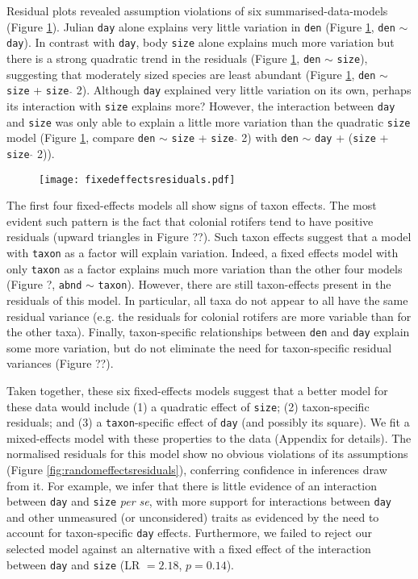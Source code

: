 \documentclass[12pt]{ecology}
\begin{document}
Residual plots revealed assumption violations of six summarised-data-models (Figure \ref{fig:fixedeffectsresiduals}).  Julian \texttt{day} alone explains very little variation in \texttt{den} (Figure \ref{fig:fixedeffectsresiduals}, \texttt{den} $\sim$ \texttt{day}).  In contrast with \texttt{day}, body \texttt{size} alone explains much more variation but there is a strong quadratic trend in the residuals (Figure \ref{fig:fixedeffectsresiduals}, \texttt{den} $\sim$ \texttt{size}), suggesting that moderately sized species are least abundant (Figure \ref{fig:fixedeffectsresiduals}, \texttt{den} $\sim$ \texttt{size} + \texttt{size} $\hat{}$ 2).  Although \texttt{day} explained very little variation on its own, perhaps its interaction with \texttt{size} explains more?  However, the interaction between \texttt{day} and \texttt{size} was only able to explain a little more variation than the quadratic \texttt{size} model (Figure \ref{fig:fixedeffectsresiduals}, compare \texttt{den} $\sim$ \texttt{size} + \texttt{size} $\hat{}$ 2) with \texttt{den} $\sim$ \texttt{day} + (\texttt{size} + \texttt{size} $\hat{}$ 2)).

\begin{figure}
\texttt{[image: fixedeffectsresiduals.pdf]}
\caption{}
\label{fig:fixedeffectsresiduals}
\end{figure}

The first four fixed-effects models all show signs of taxon effects.  The most evident such pattern is the fact that colonial rotifers tend to have positive residuals (upward triangles in Figure ??).  Such taxon effects suggest that a model with \texttt{taxon} as a factor will explain variation.  Indeed, a fixed effects model with only \texttt{taxon} as a factor explains much more variation than the other four models (Figure ?, \texttt{abnd} $\sim$ \texttt{taxon}).  However, there are still taxon-effects present in the residuals of this model.  In particular, all taxa do not appear to all have the same residual variance (e.g. the residuals for colonial rotifers are more variable than for the other taxa).  Finally, taxon-specific relationships between \texttt{den} and \texttt{day} explain some more variation, but do not eliminate the need for taxon-specific residual variances (Figure ??).

Taken together, these six fixed-effects models suggest that a better model for these data would include (1) a quadratic effect of \texttt{size}; (2) taxon-specific residuals; and (3) a \texttt{taxon}-specific effect of \texttt{day} (and possibly its square).  We fit a mixed-effects model with these properties to the data (Appendix for details).  The normalised residuals for this model show no obvious violations of its assumptions (Figure \ref{fig:randomeffectsresiduals}), conferring confidence in inferences draw from it.  For example, we infer that there is little evidence of an interaction between \texttt{day} and \texttt{size} \emph{per se}, with more support for interactions between \texttt{day} and other unmeasured (or unconsidered) traits as evidenced by the need to account for taxon-specific \texttt{day} effects.  Furthermore, we failed to reject our selected model against an alternative with a fixed effect of the interaction between \texttt{day} and \texttt{size} (LR $= 2.18$, $p = 0.14$).
\end{document}

